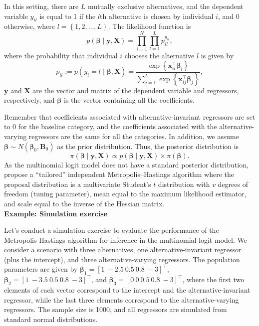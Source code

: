 In this setting, there are $L$ mutually exclusive alternatives, and the dependent variable $y_{il}$ is equal to 1 if the $l$th alternative is chosen by individual $i$, and 0 otherwise, where $l=\left\{1,2,\dots,L\right\}$. The likelihood function is 
\[
p(\bm{\beta} \mid \bm{y}, \bm{X}) = \prod_{i=1}^{N} \prod_{l=1}^{L} p_{il}^{y_{il}},
\]
where the probability that individual $i$ chooses the alternative $l$ is given by
\[
p_{il} := p(y_i = l \mid \bm{\beta}, \bm{X}) = \frac{\exp\left\{\bm{x}_{il}^{\top} \bm{\beta}_l\right\}}{\sum_{j=1}^{L} \exp\left\{\bm{x}_{ij}^{\top} \bm{\beta}_j\right\}},
\]
$\bm{y}$ and $\bm{X}$ are the vector and matrix of the dependent variable and regressors, respectively, and $\bm{\beta}$ is the vector containing all the coefficients. 

Remember that coefficients associated with alternative-invariant regressors are set to 0 for the baseline category, and the coefficients associated with the alternative-varying regressors are the same for all the categories. In addition, we assume $\bm{\beta} \sim N(\bm{\beta}_0, \bm{B}_0)$ as the prior distribution. Thus, the posterior distribution is 
\[
\pi(\bm{\beta} \mid \bm{y}, \bm{X}) \propto p(\bm{\beta} \mid \bm{y}, \bm{X}) \times \pi(\bm{\beta}).
\]
As the multinomial logit model does not have a standard posterior distribution, \cite{rossi2012bayesian} propose a ``tailored'' independent Metropolis--Hastings algorithm where the proposal distribution is a multivariate Student's $t$ distribution with $v$ degrees of freedom (tuning parameter), mean equal to the maximum likelihood estimator, and scale equal to the inverse of the Hessian matrix.\\

\textbf{Example: Simulation exercise}

Let's conduct a simulation exercise to evaluate the performance of the Metropolis-Hastings algorithm for inference in the multinomial logit model. We consider a scenario with three alternatives, one alternative-invariant regressor (plus the intercept), and three alternative-varying regressors. The population parameters are given by $\bm{\beta}_1 = [1 \ -2.5 \ 0.5 \ 0.8 \ -3]^{\top}$, $\bm{\beta}_2 = [1 \ -3.5 \ 0.5 \ 0.8 \ -3]^{\top}$, and $\bm{\beta}_3 = [0 \ 0 \ 0.5 \ 0.8 \ -3]^{\top}$, where the first two elements of each vector correspond to the intercept and the alternative-invariant regressor, while the last three elements correspond to the alternative-varying regressors. The sample size is 1000, and all regressors are simulated from standard normal distributions.

